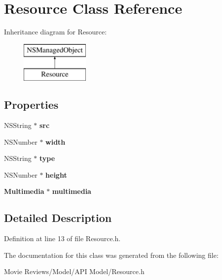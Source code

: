 \section{Resource Class Reference}
\label{interface_resource}
Inheritance diagram for Resource\+:\begin{figure}[H]
\begin{center}
\leavevmode
\includegraphics[height=2.000000cm]{interface_resource}
\end{center}
\end{figure}
\subsection*{Properties}
\begin{DoxyCompactItemize}
\item 
N\+S\+String $\ast$ {\bfseries src}\label{interface_resource_a2e69a2d115c09a73649f38b74db5a108}

\item 
N\+S\+Number $\ast$ {\bfseries width}\label{interface_resource_a562666f03b7040ffbd20ce89a30f4b78}

\item 
N\+S\+String $\ast$ {\bfseries type}\label{interface_resource_a23b8e62e9bb3dcb83de8387a46732e0c}

\item 
N\+S\+Number $\ast$ {\bfseries height}\label{interface_resource_a14a5b547884bc5fa0b1079074a25c88b}

\item 
{\bf Multimedia} $\ast$ {\bfseries multimedia}\label{interface_resource_a697206c34d620150a6dbe54e585a57e8}

\end{DoxyCompactItemize}


\subsection{Detailed Description}


Definition at line 13 of file Resource.\+h.



The documentation for this class was generated from the following file\+:\begin{DoxyCompactItemize}
\item 
Movie Reviews/\+Model/\+A\+P\+I Model/Resource.\+h\end{DoxyCompactItemize}
